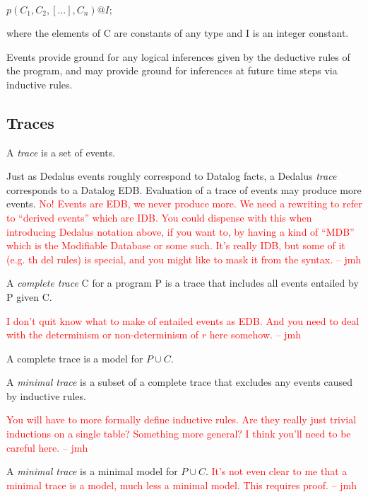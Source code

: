 \documentclass{acm_proc_article-sp-sigmod09}
\newcommand{\jmh}[1]{{\textcolor{red}{#1 -- jmh}}}
\begin{document}
$p(C_{1},C_{2},[...],C_{n})@I;$


where the elements of C are constants of any type and I is an integer constant.

Events provide ground for any logical inferences given by the deductive rules of the program, and may provide ground for inferences at 
future time steps via inductive rules.


\subsection{Traces}

\begin{definition}
A \emph{trace} is a set of events.
\end{definition}

Just as Dedalus events roughly correspond to Datalog facts, a Dedalus \emph{trace} corresponds to a Datalog EDB.
Evaluation of a trace of events may produce more events.  \jmh{No!  Events are EDB, we never produce more.  We need a rewriting to refer to ``derived events'' which are IDB.  You could dispense with this when introducing Dedalus notation above, if you want to, by having a kind of ``MDB'' which is the Modifiable Database or some such.  It's really IDB, but some of it (e.g. th del rules) is special, and you might like to mask it from the syntax.}

\begin{definition}
A \emph{complete trace} C for a program P is a trace that includes all events entailed by P given C.
\end{definition}
\jmh{I don't quit know what to make of entailed events as EDB.  And you need to deal with the determinism or non-determinism of $r$ here somehow.}

A complete trace is a model for $P \cup C$.

\begin{definition}
A \emph{minimal trace} is a subset of a complete trace that excludes any events caused by inductive rules.
\end{definition}

\jmh{You will have to more formally define inductive rules. Are they really just trivial inductions on a single table?  Something more general?  I think you'll need to be careful here.}

A \emph{minimal trace} is a minimal model for $P \cup C$.
\jmh{It's not even clear to me that a minimal trace is a model, much less a minimal model.  This requires proof.}
\end{document}
